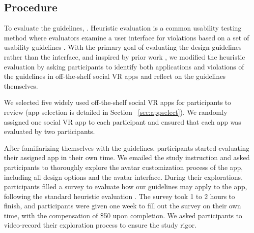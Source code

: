\subsection{Procedure}
To evaluate the guidelines, . Heuristic evaluation is a common usability testing method where evaluators examine a user interface for violations based on a set of usability guidelines \cite{nielsen1990heuristic}. With the primary goal of evaluating the design guidelines rather than the interface, and inspired by prior work \cite{human_ai_guidelines}, we modified the heuristic evaluation by asking participants to identify both applications and violations of the guidelines in off-the-shelf social VR apps and reflect on the guidelines themselves.  %

We selected five widely used off-the-shelf social VR apps for participants to review (app selection is detailed in Section ~\ref{sec:appselect}). We randomly assigned one social VR app to each participant and ensured that each app was evaluated by two participants. 

After familiarizing themselves with the guidelines, participants started evaluating their assigned app in their own time. We emailed the study instruction and asked participants to thoroughly explore the avatar customization process of the app, including all design options and the avatar interface. During their explorations, participants filled a survey to evaluate how our guidelines may apply to the app, following the standard heuristic evaluation \cite{nielsen1990heuristic}. The survey took 1 to 2 hours to finish, and participants were given one week to fill out the survey on their own time, with the compensation of \$50 upon completion. We asked participants to video-record their exploration process to ensure the study rigor. 

